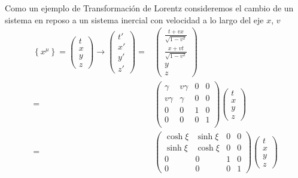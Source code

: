 \begin{frame}


Como un ejemplo de Transformación de Lorentz consideremos el cambio de un sistema en reposo a un sistema inercial con velocidad a lo largo del eje $x$, $v$
\begin{align}
\label{eq:147}
  \left\{x^\mu\right\}=\begin{pmatrix}
    t\\
    x\\
    y\\
    z
  \end{pmatrix}\to
  \begin{pmatrix}
    t'\\
    x'\\
    y'\\
    z'
  \end{pmatrix}=&
  \begin{pmatrix}
  \displaystyle{ \frac{t+vx}{\sqrt{1-v^2}} }\\
  \displaystyle{ \frac{x+vt}{\sqrt{1-v^2}} }\\
    y\\
    z
  \end{pmatrix} \nonumber\\
=&\begin{pmatrix}
  \gamma   & v \gamma & 0 & 0 \\
  v \gamma & \gamma & 0 & 0\\
  0 & 0 & 1 & 0 \\
    0 & 0 & 0 & 1 \\
   \end{pmatrix} 
\begin{pmatrix}
    t\\
    x\\
    y\\
    z
  \end{pmatrix}\nonumber\\
  =&
  \begin{pmatrix}
    \cosh\xi&\sinh\xi&0&0\\
    \sinh\xi&\cosh\xi&0&0\\
    0     &  0  &1&0\\
    0     &  0  &0&1
  \end{pmatrix}
  \begin{pmatrix}
    t\\
    x\\
    y\\
    z
  \end{pmatrix} \nonumber\\

\end{align}
\end{frame}
